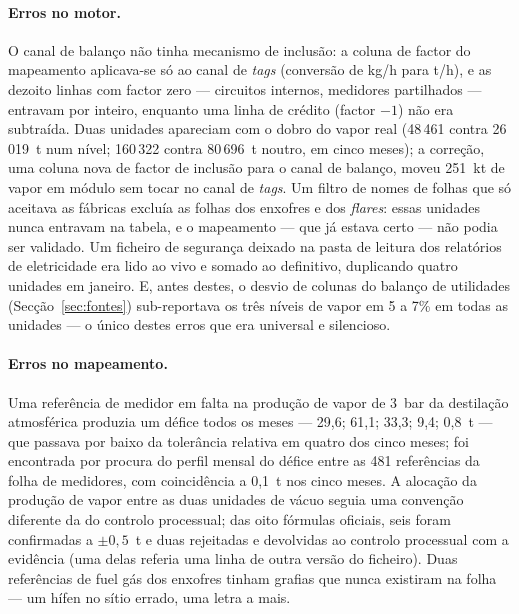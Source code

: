 \paragraph{Erros no motor.} O canal de balanço não tinha mecanismo de
inclusão: a coluna de factor do mapeamento aplicava-se só ao canal de
\emph{tags} (conversão de kg/h para t/h), e as dezoito linhas com factor
zero --- circuitos internos, medidores partilhados --- entravam por
inteiro, enquanto uma linha de crédito (factor $-1$) não era subtraída.
Duas unidades apareciam com o dobro do vapor real (48\,461 contra
26\,019~t num nível; 160\,322 contra 80\,696~t noutro, em cinco meses); a
correção, uma coluna nova de factor de inclusão para o canal de balanço,
moveu 251~kt de vapor em módulo sem tocar no canal de \emph{tags}. Um
filtro de nomes de folhas que só aceitava as fábricas excluía as folhas
dos enxofres e dos \emph{flares}: essas unidades nunca entravam na tabela,
e o mapeamento --- que já estava certo --- não podia ser validado. Um
ficheiro de segurança deixado na pasta de leitura dos relatórios de
eletricidade era lido ao vivo e somado ao definitivo, duplicando quatro
unidades em janeiro. E, antes destes, o desvio de colunas do balanço de
utilidades (Secção~\ref{sec:fontes}) sub-reportava os três níveis de vapor
em 5 a 7\% em todas as unidades --- o único destes erros que era
universal e silencioso.

\paragraph{Erros no mapeamento.} Uma referência de medidor em falta na
produção de vapor de 3~bar da destilação atmosférica produzia um défice
todos os meses --- 29,6; 61,1; 33,3; 9,4; 0,8~t --- que passava por baixo
da tolerância relativa em quatro dos cinco meses; foi encontrada por
procura do perfil mensal do défice entre as 481 referências da folha de
medidores, com coincidência a 0,1~t nos cinco meses. A alocação da
produção de vapor entre as duas unidades de vácuo seguia uma convenção
diferente da do controlo processual; das oito fórmulas oficiais, seis
foram confirmadas a $\pm0{,}5$~t e duas rejeitadas e devolvidas ao
controlo processual com a evidência (uma delas referia uma linha de
outra versão do ficheiro). Duas referências de fuel gás dos enxofres
tinham grafias que nunca existiram na folha --- um hífen no sítio errado,
uma letra a mais.

